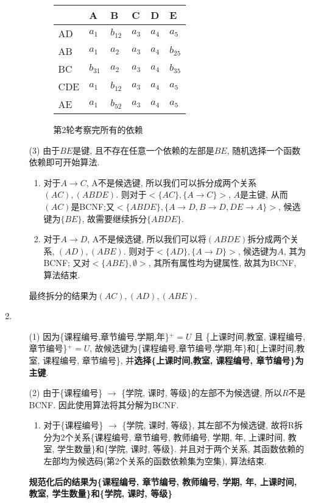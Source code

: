\documentclass[10pt, a4paper]{article}
\begin{document}
\begin{enumerate}
\begin{enumerate}
\begin{figure}[H]
\begin{minipage}[b]{0.5\linewidth}
				\end{minipage}
				\begin{minipage}[b]{0.5\linewidth}
					\centering
					\begin{tabular}{|l|l|l|l|l|l|}
						\hline
							& A & B & C & D & E \\ \hline
						AD  & $a_1$ & $b_{12}$ & $a_3$  & $a_4$  & $a_5$  \\ \hline
						AB  & $a_1$ & $a_2$  & $a_3$  & $a_4$ & $b_{25}$  \\ \hline
						BC  & $b_{31}$ &  $a_2$ & $a_3$ & $a_4$ & $b_{35}$ \\ \hline
						CDE & $a_1$ & $b_{12}$ & $a_3$ & $a_4$ & $a_5$ \\ \hline
						AE  & $a_1$ & $b_{52}$ & $a_3$ & $a_4$ & $a_5$ \\ \hline
						\end{tabular}
						\caption{第2轮考察完所有的依赖}\label{tab:8}
				\end{minipage}
			\end{figure}
			
			\item[(3)] 由于$BE$是键, 且不存在任意一个依赖的左部是$BE$, 随机选择一个函数依赖即可开始算法.
			\begin{enumerate}
				\item 对于$A\to C$, A不是候选键, 所以我们可以拆分成两个关系$(AC), (ABDE)$. 则对于$<\{AC\}, \{A\to C\}>$, $A$是主键, 从而$(AC)$是BCNF;又$<\{ABDE\}, \{A\to D, B\to D, DE\to A\}>$, 候选键为$\{BE\}$, 故需要继续拆分$\{ABDE\}$.
				\item 对于$A\to D$, A不是候选键, 所以我们可以将$(ABDE)$拆分成两个关系, $(AD), (ABE)$. 则对于$<\{AD\}, \{A\to D\}>$, 候选键为$A$, 其为BCNF; 又对$<\{ABE\}, \emptyset >$, 其所有属性均为键属性, 故其为BCNF, 算法结束.
			\end{enumerate} 
			最终拆分的结果为$(AC), (AD), (ABE)$.
		\end{enumerate}
		\item \begin{enumerate}
			\item[(1)] 因为\{课程编号,章节编号,学期,年\}$^+ = U$ 且 \{上课时间,教室, 课程编号, 章节编号\}$^+ = U$, 故候选键为\{课程编号,章节编号,学期,年\}和\{上课时间,教室, 课程编号, 章节编号\}, 并\textbf{选择\{上课时间,教室, 课程编号, 章节编号\}为主键}.
			\item[(2)] 由于\{课程编号\} $\to$ \{学院, 课时, 等级\}的左部不为候选键, 所以$R$不是BCNF. 因此使用算法将其分解为BCNF.
			\begin{enumerate}
				\item 对于\{课程编号\} $\to$ \{学院, 课时, 等级\}, 其左部不为候选键, 故将R拆分为2个关系\{课程编号, 章节编号, 教师编号, 学期, 年, 上课时间, 教室, 学生数量\}和\{学院, 课时, 等级\}.
				并且对于两个关系, 其函数依赖的左部均为候选码(第2个关系的函数依赖集为空集), 算法结束.
			\end{enumerate} 
			\textbf{规范化后的结果为\{课程编号, 章节编号, 教师编号, 学期, 年, 上课时间, 教室, 学生数量\}和\{学院, 课时, 等级\}
}		\end{enumerate}
	\end{enumerate}
\end{document}
